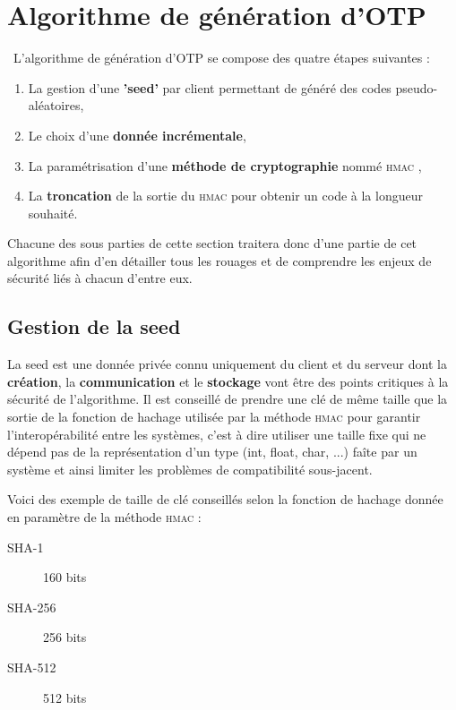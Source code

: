 \documentclass[a4paper, 10pt]{article}
\newcommand{\otp}{\textsc{OTP} }
\newcommand{\hmac}{\textsc{hmac} }
\begin{document}
\newpage
    \section{Algorithme de génération d'\otp}

\noindent\ L'algorithme de génération d'\otp se compose des quatre étapes suivantes :
    \begin{enumerate}
        \item La gestion d'une \textbf{'seed'} par client permettant de généré des codes pseudo-aléatoires,
        \item Le choix d'une \textbf{donnée incrémentale},
        \item La paramétrisation d'une \textbf{méthode de cryptographie} nommé \hmac,
        \item La \textbf{troncation} de la sortie du \hmac pour obtenir un code à la longueur souhaité.\\
    \end{enumerate}

    Chacune des sous parties de cette section traitera donc d'une partie de cet algorithme afin d'en détailler tous les rouages et de comprendre les enjeux de sécurité liés à chacun d'entre eux.

    \subsection{Gestion de la seed}

    La seed est une \textcolor{myblue}{donnée privée} connu uniquement du client et du serveur dont la \textbf{\textcolor{myblue}{création}}, la \textbf{\textcolor{myblue}{communication}} et le \textbf{\textcolor{myblue}{stockage}} vont être des points critiques à la \textcolor{mygreen}{sécurité de l’algorithme}. 
Il est conseillé de prendre une \textcolor{myblue}{clé de même taille que la sortie de la fonction de hachage} utilisée par la méthode \hmac pour garantir l’\textcolor{mygreen}{interopérabilité} entre les systèmes, 
c'est à dire utiliser une taille fixe qui ne dépend pas de la représentation d'un type (int, float, char, ...) faîte par un système et ainsi limiter les problèmes de compatibilité
sous-jacent.

Voici des exemple de taille de clé conseillés selon la fonction de hachage donnée en paramètre de la méthode \hmac :
\begin{description}
    \item[SHA-1] 160 bits
    \item[SHA-256] 256 bits
    \item[SHA-512] 512 bits    
\end{description}
\end{document}
